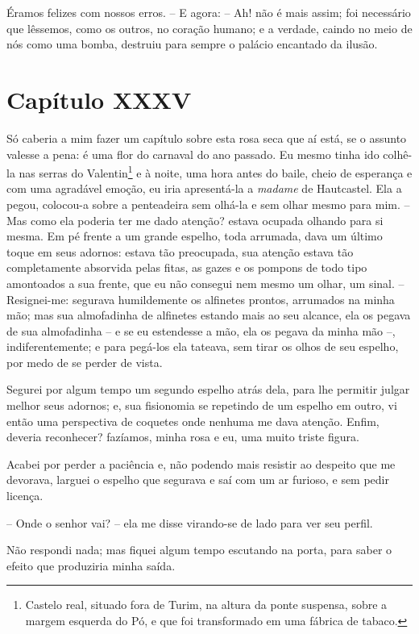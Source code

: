  Éramos felizes com nossos erros. -- E agora: -- Ah! não é mais assim;
foi necessário que lêssemos, como os outros, no coração humano; e a
verdade, caindo no meio de nós como uma bomba, destruiu para sempre o
palácio encantado da ilusão.

\section*{Capítulo XXXV}

 Só caberia a mim fazer um capítulo sobre esta rosa seca que aí está, se
o assunto valesse a pena: é uma flor do carnaval do ano passado. Eu
mesmo tinha ido colhê-la nas serras do Valentin\footnote{ Castelo real,
situado fora de Turim, na altura da ponte suspensa, sobre a margem
esquerda do Pó, e que foi transformado em uma fábrica de tabaco.}
e à noite, uma hora antes do baile, cheio de esperança e com uma
agradável emoção, eu iria apresentá-la a \textit{madame} de Hautcastel.
Ela a pegou, colocou-a sobre a penteadeira sem olhá-la e sem olhar
mesmo para mim. -- Mas como ela poderia ter me dado atenção? estava
ocupada olhando para si mesma. Em pé frente a um grande espelho, toda
arrumada, dava um último toque em seus adornos: estava tão preocupada,
sua atenção estava tão completamente absorvida pelas fitas, as gazes e
os pompons de todo tipo amontoados a sua frente, que eu não consegui
nem mesmo um olhar, um sinal. -- Resignei-me: segurava humildemente os
alfinetes prontos, arrumados na minha mão; mas sua almofadinha de
alfinetes estando mais ao seu alcance, ela os pegava de sua
almofadinha -- e se eu estendesse a mão, ela os pegava da minha mão
--, indiferentemente; e para pegá-los ela tateava, sem tirar os olhos
de seu espelho, por medo de se perder de vista.

 Segurei por algum tempo um segundo espelho atrás dela, para lhe
permitir julgar melhor seus adornos; e, sua fisionomia se repetindo de
um espelho em outro, vi então uma perspectiva de coquetes onde nenhuma
me dava atenção. Enfim, deveria reconhecer? fazíamos, minha rosa e eu,
uma muito triste figura.

 Acabei por perder a paciência e, não podendo mais resistir ao despeito
que me devorava, larguei o espelho que segurava e saí com um ar
furioso, e sem pedir licença.

 -- Onde o senhor vai? -- ela me disse virando-se de lado para ver seu
perfil. 

Não respondi nada; mas fiquei algum tempo escutando na porta, para saber
o efeito que produziria minha saída.

